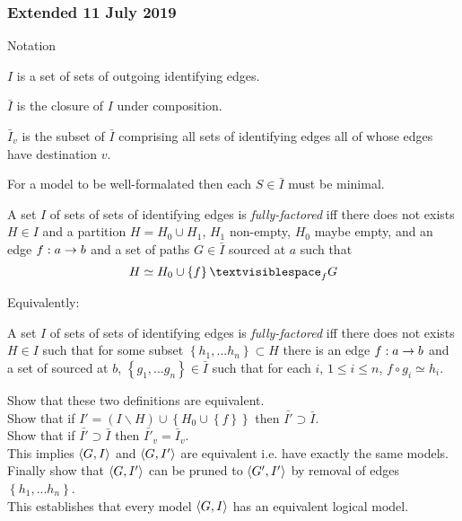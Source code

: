 \documentclass[10pt,a4paper]{article}
\newcommand{\set}[1]{\left\{#1\right\}}
\newcommand{\veee}{v}
\newcommand{\term}[1]{\textit{{#1}}}
\begin{document}
\subsubsection{Extended 11 July 2019}
Notation

$I$ is a set of sets of outgoing identifying edges.

$\bar{I}$ is the closure of $I$ under composition.

$\bar{I}_v$ is the subset of $\bar{I}$ comprising all sets of identifying edges all of whose
edges have destination $\veee$.

For a model to be well-formalated then each $S \in \bar{I}$ must be minimal.

\begin{definition}
A set $I$ of sets of sets of identifying edges is \term{fully-factored} iff 
there does not exists $H \in I$ and a partition $H=H_0 \cup H_1$, $H_1$ non-empty, $H_0$ maybe empty,
and an edge $f: a \rightarrow b$ and a set of paths $G \in \bar{I}$ sourced at $a$ such that
$$H \simeq H_0 \cup \set{f}  \textvisiblespace_f G$$
\end{definition}

Equivalently:

\begin{definition}
A set $I$ of sets of sets of identifying edges is \term{fully-factored} iff 
there does not exists $H \in I$ such that for some subset $\set{h_1,...h_n} \subset H$
there is an edge $f:a \rightarrow b$ and a set of sourced at $b$, $\set{g_1,...g_n} \in \bar{I}$
such that for each $i$, $1 \leq i \leq n$, $f \circ g_i \simeq h_i$.
\end{definition}

Show that these two  definitions are equivalent. \\

Show that if $I' = (I \backslash H) \cup \set{H_0 \cup \set{f}}$ then $\bar{I'} \supset \bar{I}$.\\

Show that if $\bar{I'} \supset \bar{I}$ then $\bar{I'}_v=\bar{I}_v$.\\

This implies $\langle G,I\rangle$ and $\langle G,I'\rangle$ are equivalent i.e. have exactly the same models.\\

Finally show that $\langle G,I'\rangle$  can be pruned to $\langle G',I'\rangle$ by removal of edges $\set{h_1,...h_n}$.\\

This establishes that every model $\langle G,I\rangle$ has an equivalent logical model.\\
\end{document}
